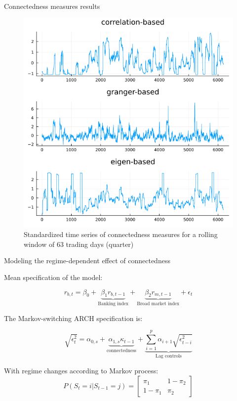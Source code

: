 \documentclass{beamer}
\begin{document}
\begin{frame}{Connectedness measures results}

    \begin{figure}[H]
        \caption{Standardized time series of connectedness measures for a rolling window of 63 trading days (quarter)}
        \includegraphics[scale=0.3]{connectmeasures.png}
        \centering
    \end{figure}    
\end{frame}    


\begin{frame}{Modeling the regime-dependent effect of connectedness}

    Mean specification of the model: 
    
    $$r_{b,t} = \beta_0 + \underbrace{\beta_1 r_{b,t-1}}_{\text{Banking index}} + \underbrace{\beta_2 r_{m,t-1}}_{\text{Broad market index}} + \epsilon_t$$
    
    The Markov-switching ARCH specification is:
    
    $$\sqrt{\epsilon^2_t} = \alpha_{0,s} + \underbrace{\alpha_{1,s}\kappa_{t-1}}_{\text{connectedness}} + \underbrace{\sum_{i=1}^{p} \alpha_{i+1} \sqrt{\epsilon^2_{t-i}}}_{\text{Lag controls}}$$
    
    
    With regime changes according to Markov process: \begin{equation*}
        P(S_t = i | S_{t-1} = j) = \begin{bmatrix}
          \pi_1 & 1 - \pi_2\\
            1 - \pi_1 & \pi_2
            \end{bmatrix}
    \end{equation*}
    
\end{frame}
\end{document}
